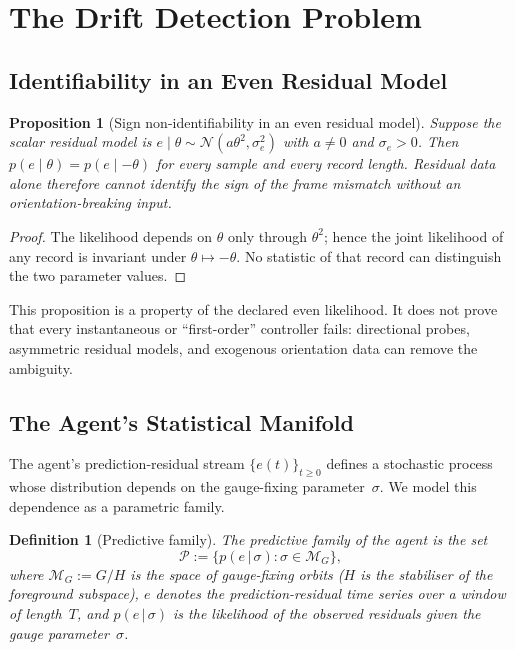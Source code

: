 \documentclass[12pt,a4paper,openany]{book}
\newtheorem{proposition}[theorem]{Proposition}
\newtheorem{definition}[theorem]{Definition}
\begin{document}
\section{The Drift Detection Problem}
\label{III-sec:detection}

\subsection{Identifiability in an Even Residual Model}
\label{III-subsec:first_order}

\begin{proposition}[Sign non-identifiability in an even residual model]
\label{III-prop:first_order_nonidentifiability}
Suppose the scalar residual model is
$e\mid\theta\sim\mathcal N(a\theta^2,\sigma_e^2)$ with
$a\neq0$ and $\sigma_e>0$.  Then
$p(e\mid\theta)=p(e\mid-\theta)$ for every sample and every
record length.  Residual data alone therefore cannot identify the sign
of the frame mismatch without an orientation-breaking input.
\end{proposition}

\begin{proof}
The likelihood depends on $\theta$ only through $\theta^2$; hence the
joint likelihood of any record is invariant under
$\theta\mapsto-\theta$.  No statistic of that record can distinguish
the two parameter values.
\end{proof}

This proposition is a property of the declared even likelihood.  It
does not prove that every instantaneous or ``first-order'' controller
fails: directional probes, asymmetric residual models, and exogenous
orientation data can remove the ambiguity.

\subsection{The Agent's Statistical Manifold}
\label{III-subsec:stat_manifold}

The agent's prediction-residual stream
$\{e(t)\}_{t \geq 0}$ defines a stochastic process whose
distribution depends on the gauge-fixing
parameter~$\sigma$.
We model this dependence as a parametric family.

\begin{definition}[Predictive family]
\label{III-def:predictive_family}
The \emph{predictive family} of the agent is the set
\begin{equation}
\label{III-eq:predictive_family}
\mathcal{P}
:= \bigl\{p(e\,|\,\sigma)
  : \sigma \in \mathcal{M}_G\bigr\},
\end{equation}
where $\mathcal{M}_G := G/H$ is the space of gauge-fixing
orbits ($H$ is the stabiliser of the foreground subspace),
$e$ denotes the prediction-residual time series over a
window of length~$T$, and $p(e\,|\,\sigma)$ is the
likelihood of the observed residuals given the gauge
parameter~$\sigma$.
\end{definition}
\end{document}
